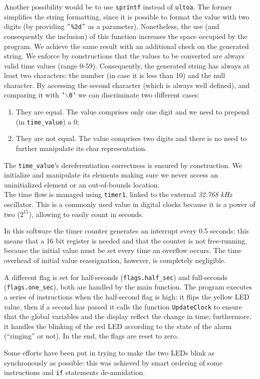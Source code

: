 Another possibility would be to use \texttt{sprintf} instead of \texttt{ultoa}. The former simplifies the string formatting, since it is possible to format the value with two digits (by providing \texttt{$"$\%2d$"$} as a parameter). Nonetheless, the use (and consequently the inclusion) of this function increases the space occupied by the program. We achieve the same result with an additional check on the generated string. We enforce by constructions that the values to be converted are always valid time values (range 0-59). Consequently, the generated string has always at least two characters: the number (in case it is less than 10) and the null character. By accessing the second character (which is always well defined), and comparing it with \texttt{'$\backslash$0'} we can discriminate two different cases:
\begin{enumerate}
	\item They are equal. The value comprises only one digit and we need to prepend (in \texttt{time\_value}) a $0$;
	\item They are not equal. The value comprises two digits and there is no need to further manipulate its char representation.
\end{enumerate}
The \texttt{time\_value}'s dereferentiation correctness is ensured by construction. We initialize and manipulate its elements making sure we never access an uninitialized element or an out-of-bounds location.\\

The time flow is managed using \texttt{timer1}, linked to the external \textit{32.768 kHz} oscillator. This is a commonly used value in digital clocks because it is a power of two ($2^{15}$), allowing to easily count in seconds.

In this software the timer counter generates an interrupt every 0.5 seconds; this means that a 16 bit register is needed and that the counter is not free-running, because the initial value must be set every time an overflow occurs. The time overhead of initial value reassignation, however, is completely negligible.

A different flag is set for half-seconds (\texttt{flags.half\_sec}) and full-seconds (\texttt{flags.one\_sec}), both are handled by the main function.
The program executes a series of instructions when the half-second flag is high: it flips the yellow LED value, then if a second has passed it calls the function \texttt{UpdateClock} to ensure that the global variables and the display reflect the change in time; furthermore, it handles the blinking of the red LED according to the state of the alarm (``ringing'' or not). In the end, the flags are reset to zero.

Some efforts have been put in trying to make the two LEDs blink as synchronously as possible: this was achieved by smart ordering of some instructions and \texttt{if} statements de-annidation.